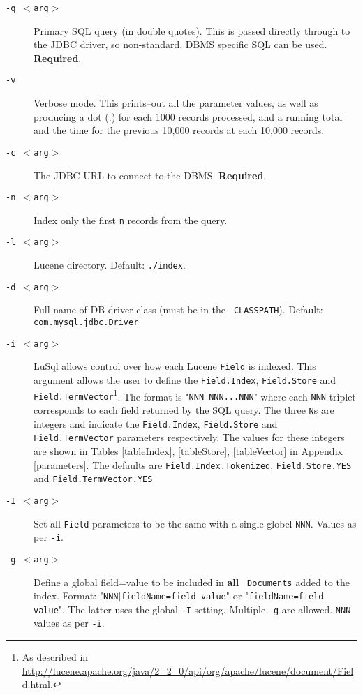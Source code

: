 \begin{description}

\item [\tt -q $<$arg$>$] Primary SQL query (in double quotes). 
  This is passed directly through to the JDBC driver, so non-standard,
  DBMS specific SQL can be used.
  {\bf Required}.


\item[\tt -v] Verbose mode. This prints--out all the parameter values, as well as
  producing a dot (.) for each 1000 records processed, and a running total and
  the time for the previous 10,000 records at each 10,000 records.


\item [\tt -c $<$arg$>$] The JDBC URL to connect to the DBMS. {\bf Required}.

\item [\tt -n $<$arg$>$] Index only the first {\tt n} records from the query.


\item [\tt -l $<$arg$>$] Lucene directory. Default: {\tt ./index}. 


\item [\tt -d $<$arg$>$] Full name of DB driver class (must be in the {\tt
    CLASSPATH}). 
  Default: {\tt com.mysql.jdbc.Driver}


\item [\tt -i $<$arg$>$] LuSql allows control over how each Lucene {\tt Field} is
  indexed.
  This argument allows the user to define the 
  {\tt Field.Index}, {\tt Field.Store} and {\tt Field.TermVector}\footnote{As
    described in
    \url{http://lucene.apache.org/java/2_2_0/api/org/apache/lucene/document/Field.html}.}. 
  The format is "{\tt NNN NNN...NNN}" where each {\tt NNN} triplet corresponds
  to each field returned by the SQL query.
  The three {\tt N}s are integers and indicate the  
  {\tt Field.Index}, {\tt Field.Store} and {\tt Field.TermVector} parameters
  respectively.  
  The values for these integers are shown in Tables 
  \ref{tableIndex}, \ref{tableStore}, \ref{tableVector} in Appendix
  \ref{parameters}. 
  The defaults are {\tt Field.Index.Tokenized}, {\tt Field.Store.YES} and {\tt Field.TermVector.YES}


\item[\tt -I $<$arg$>$] Set all {\tt Field} parameters to be the same with a
  single globel {\tt NNN}. Values as per {\tt -i}.


\item [\tt -g $<$arg$>$] Define a global field=value to be included in {\bf all} {\tt
    Documents} added to the index. 
  Format: "{\tt NNN$|$fieldName=field value}"
  or "{\tt fieldName=field value}". 
  The latter uses the global {\tt -I} setting.
  Multiple {\tt -g} are allowed. {\tt NNN} values as per {\tt -i}.



\end{description}
